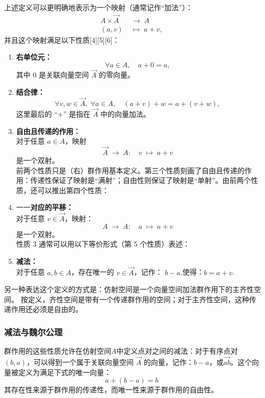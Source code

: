 上述定义可以更明确地表示为一个映射（通常记作“加法”）：
$$
\begin{aligned}
A \times \overrightarrow{A} &\;\longrightarrow\; A \\
(a, v) &\;\longmapsto\; a + v,
\end{aligned}~
$$
并且这个映射满足以下性质[4][5][6]：
\begin{enumerate}
\item \textbf{右单位元：}\\
$$
\forall a \in A, \quad a + 0 = a,~
$$
其中 $0$ 是关联向量空间 $\overrightarrow{A}$ 的零向量。
\item \textbf{结合律：}\\
$$
\forall v, w \in \overrightarrow{A},\; \forall a \in A, \quad (a + v) + w = a + (v + w),~
$$
这里最后的 “+” 是指在 $\overrightarrow{A}$ 中的向量加法。
\item \textbf{自由且传递的作用：}\\
对于任意 $a \in A$，映射
$$
\overrightarrow{A} \;\longrightarrow\; A: \quad v \;\longmapsto\; a + v~
$$
是一个双射。\\
前两个性质只是（右）群作用基本定义。第三个性质刻画了自由且传递的作用：传递性保证了映射是“满射”；自由性则保证了映射是“单射”。由前两个性质，还可以推出第四个性质：
\item 一一\textbf{对应的平移：}\\
对于任意 $v \in \overrightarrow{A}$，映射：
$$
A \;\longrightarrow\; A: \quad a \;\mapsto\; a + v~
$$
是一个双射。\\
性质 3 通常可以用以下等价形式（第 5 个性质）表述：\\
\item \textbf{减法：}\\
对于任意 $a, b \in A$，存在唯一的 $v \in \overrightarrow{A}$，记作：
$b - a$,使得：$b = a + v$.
\end{enumerate}
另一种表达这个定义的方式是：仿射空间是一个向量空间加法群作用下的主齐性空间。
按定义，齐性空间是带有一个传递群作用的空间；对于主齐性空间，这种传递作用还必须是自由的。
\subsubsection{减法与魏尔公理}
群作用的这些性质允许在仿射空间$A$中定义点对之间的减法：对于有序点对 $(b, a)$，可以得到一个属于关联向量空间 $\overrightarrow{A}$ 的向量，记作：$b - a$，或$\overrightarrow{ab}$。这个向量被定义为满足下式的唯一向量：
$$
a + (b - a) = b~
$$
其存在性来源于群作用的传递性，而唯一性来源于群作用的自由性。


